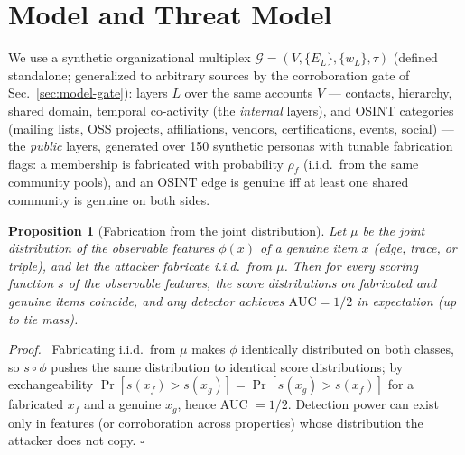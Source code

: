 \documentclass[conference]{IEEEtran}
\newtheorem{proposition}{Proposition}
\providecommand{\proofname}{Proof}
\newenvironment{proof}{\noindent\emph{\proofname.}\ \ignorespaces}{\hfill$\square$\par\medskip}
\begin{document}
\section{Model and Threat Model}
\label{sec:model}

We use a synthetic organizational multiplex
$\mathcal{G}=(V,\{E_L\},\{w_L\},\tau)$ (defined standalone; generalized to
arbitrary sources by the corroboration gate of Sec.~\ref{sec:model-gate}):
layers $L$ over the same accounts $V$ --- contacts, hierarchy, shared domain,
temporal co-activity (the \emph{internal} layers), and OSINT categories
(mailing lists, OSS projects, affiliations, vendors, certifications, events,
social) --- the \emph{public} layers, generated over 150 synthetic personas
with tunable fabrication flags: a membership is fabricated with probability
$\rho_f$ (i.i.d.\ from the same community pools), and an OSINT edge is
genuine iff at least one shared community is genuine on both sides.

\begin{proposition}[Fabrication from the joint distribution]
\label{prop:fab-joint}
Let $\mu$ be the joint distribution of the observable features $\phi(x)$
of a genuine item $x$ (edge, trace, or triple), and let the attacker
fabricate i.i.d.\ from $\mu$. Then for every scoring function $s$ of the
observable features, the score distributions on fabricated and genuine
items coincide, and any detector achieves $\mathrm{AUC}=1/2$ in
expectation (up to tie mass).
\end{proposition}
\begin{proof}
Fabricating i.i.d.\ from $\mu$ makes $\phi$ identically distributed on
both classes, so $s\circ\phi$ pushes the same distribution to identical
score distributions; by exchangeability
$\Pr[s(x_f)>s(x_g)]=\Pr[s(x_g)>s(x_f)]$ for a fabricated $x_f$ and a
genuine $x_g$, hence AUC $=1/2$. Detection power can exist only in
features (or corroboration across properties) whose distribution the
attacker does not copy.
\end{proof}
\end{document}
